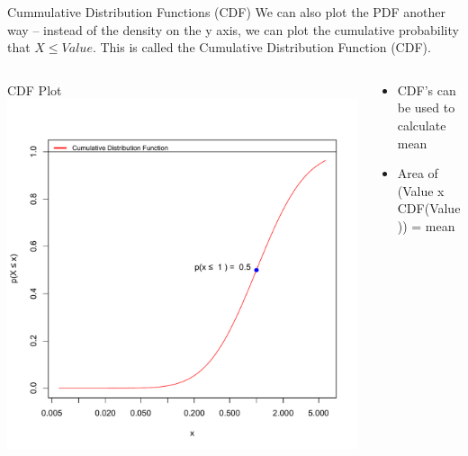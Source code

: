 \documentclass{beamer}
\begin{document}
\begin{frame}{Cummulative  Distribution Functions (CDF)}
We can also plot the PDF another way – instead of the density on the y axis, we can plot the cumulative probability that  $X \le Value$. This is called the Cumulative Distribution Function (CDF).	
\begin{columns}    
	\begin{column}{4cm}        
		\begin{center}
		CDF Plot           
	 	\includegraphics[width=1.0\textwidth]{Figure4}        
		\end{center}   
	 \end{column}    
	\begin{column}{5cm}        
	  
	\begin{itemize}
	\item CDF’s can be used to calculate mean
	\item Area of (Value x CDF(Value)) = mean
	\end{itemize}
	\end{column}
	\end{columns}

\end{frame}
\end{document}
